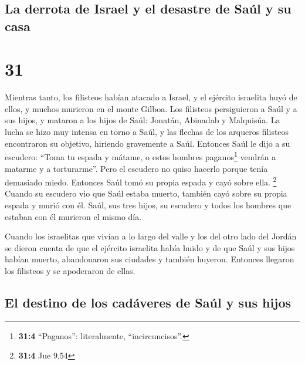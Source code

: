 \hypertarget{la-derrota-de-israel-y-el-desastre-de-sauxfal-y-su-casa}{%
\subsection{La derrota de Israel y el desastre de Saúl y su
casa}\label{la-derrota-de-israel-y-el-desastre-de-sauxfal-y-su-casa}}

\hypertarget{section-30}{%
\section{31}\label{section-30}}

 Mientras tanto, los filisteos habían atacado a Israel, y
el ejército israelita huyó de ellos, y muchos murieron en el monte
Gilboa.  Los filisteos persiguieron a Saúl y a sus hijos,
y mataron a los hijos de Saúl: Jonatán, Abinadab y Malquisúa.
 La lucha se hizo muy intensa en torno a Saúl, y las
flechas de los arqueros filisteos encontraron su objetivo, hiriendo
gravemente a Saúl.  Entonces Saúl le dijo a su escudero:
``Toma tu espada y mátame, o estos hombres paganos\footnote{\textbf{31:4}
  ``Paganos'': literalmente, ``incircuncisos''.} vendrán a matarme y a
torturarme''. Pero el escudero no quiso hacerlo porque tenía demasiado
miedo. Entonces Saúl tomó su propia espada y cayó sobre ella.
\footnote{\textbf{31:4} Jue 9,54}  Cuando su escudero vio
que Saúl estaba muerto, también cayó sobre su propia espada y murió con
él.  Saúl, sus tres hijos, su escudero y todos los hombres
que estaban con él murieron el mismo día.

 Cuando los israelitas que vivían a lo largo del valle y
los del otro lado del Jordán se dieron cuenta de que el ejército
israelita había huido y de que Saúl y sus hijos habían muerto,
abandonaron sus ciudades y también huyeron. Entonces llegaron los
filisteos y se apoderaron de ellas.

\hypertarget{el-destino-de-los-caduxe1veres-de-sauxfal-y-sus-hijos}{%
\subsection{El destino de los cadáveres de Saúl y sus
hijos}\label{el-destino-de-los-caduxe1veres-de-sauxfal-y-sus-hijos}}

